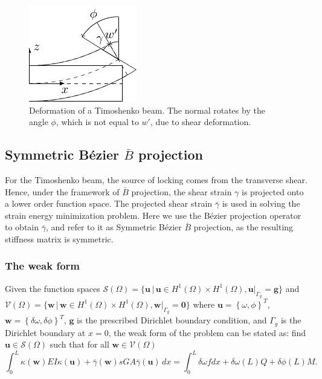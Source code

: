 \documentclass{article}
\newcommand{\Bezier}{{B\'{e}zier} }
\begin{document}
\begin{figure}[ht]
  \centering
  \includegraphics[width=0.25\linewidth]{timoshenko_beam_shape}
  \caption{Deformation of a Timoshenko beam. The normal rotates by the angle $\phi$, which is not equal to $w'$, due to shear deformation.}
  \label{fig:Timoshenko_beam_cross}
\end{figure}

\subsection{Symmetric \Bezier $\bar{B}$ projection}
{\color{blue}For the Timoshenko beam, the source of locking comes from the transverse shear. Hence, under the framework of $\bar{B}$ projection, the shear strain $\gamma$ is projected onto a lower order function space. The projected shear strain $\bar{\gamma}$ is used in solving the strain energy minimization problem. Here we use the \Bezier projection operator to obtain $\bar{\gamma}$, and refer to it as Symmetric \Bezier $\bar{B}$ projection, as the resulting stiffness matrix is symmetric.}

\subsubsection{The weak form}

\sloppy Given the function spaces $\mathcal{S}(\Omega)=\{{\mathbf{u} \, \vert \, {\mathbf{u}\in{H^1(\Omega)\times{H^1(\Omega)}}},\mathbf{u}\vert_{\Gamma_{g}}=\mathbf{g}}\}$ and $\mathcal{V}(\Omega)=\{{\mathbf{w} \, \vert \, {\mathbf{w}\in{H^1(\Omega)\times{H^1(\Omega)}}}, \allowbreak \mathbf{w}\vert_{\Gamma_{g}}=\mathbf{0}}\}$ where $\mathbf{u}=\left\{{\omega,\phi}\right\}^T$, $\mathbf{w}=\left\{{\delta\omega,\delta\phi}\right\}^T$, $\mathbf{g}$ is the prescribed Dirichlet boundary condition, and $\Gamma_g$ is the Dirichlet boundary at $x=0$, the weak form of the problem can be stated as: find $\mathbf{u}\in{\mathcal{S}(\Omega)}$ such that for all $\mathbf{w}\in{\mathcal{V}(\Omega)}$
\begin{equation}
    {\int_{0}^L\kappa(\mathbf{w})EI\kappa(\mathbf{u}) + \bar{\gamma}(\mathbf{w})sGA\bar{\gamma}(\mathbf{u})} \, dx=\int_0^L\delta\omega f dx+\delta\omega(L)Q+\delta\phi(L)M.
\end{equation}
\end{document}
